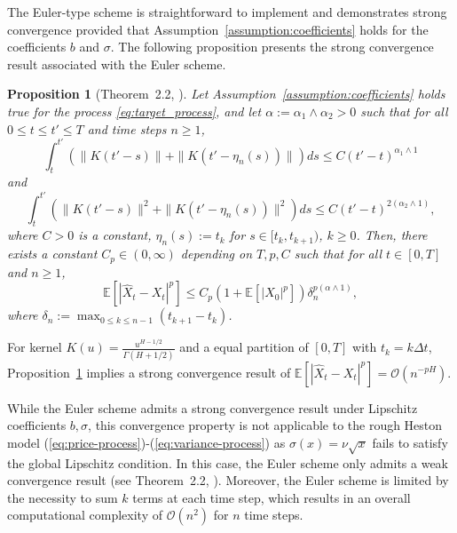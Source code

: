 \documentclass[11pt]{article}%
\newtheorem{proposition}{Proposition}
\theoremstyle{definition}
\begin{document}
The Euler-type scheme is straightforward to implement and demonstrates strong convergence provided that Assumption~\ref{assumption:coefficients} holds for the coefficients \(b\) and \(\sigma\). The following proposition presents the strong convergence result associated with the Euler scheme.

\begin{proposition}[Theorem~2.2, \cite{richard2021}]\label{prop:euler_convergence}
    Let Assumption~\ref{assumption:coefficients} holds true for the process \eqref{eq:target_process}, and let \(\alpha := \alpha_1 \wedge \alpha_2 > 0\) such that for all \(0\le t\le t'\le T\) and time steps \(n \ge 1\), \[
        \int_{t}^{t'} \left(\|K(t'-s)\| + \|K(t'-\eta_n(s))\|\right)ds \le C (t'-t)^{\alpha_1 \wedge 1}
    \]
    and \[
        \int_{t}^{t'} \left(\|K(t'-s)\|^2 + \|K(t'-\eta_n(s))\|^2\right)ds \le C (t'-t)^{2(\alpha_2 \wedge 1)},
    \]
    where \(C>0\) is a constant, \(\eta_n(s) := t_k\) for \(s \in [t_k,t_{k+1})\), \(k\ge 0\). Then, there exists a constant \(C_p \in (0,\infty)\) depending on \(T,p,C\) such that for all \(t\in [0,T]\) and \(n \ge 1\), 
    \[
    \mathbb{E}[|\widehat{X}_t - X_t|^p] \le C_p (1 + \mathbb{E}[|X_0|^p]) \delta_n^{p(\alpha \wedge 1)}, 
    \]
    where \(\delta_n := \max_{0\le k \le n-1} (t_{k+1} - t_k)\). 
\end{proposition}

For kernel \(K(u) = \tfrac{u^{H-1/2}}{\Gamma(H+1/2)}\) and a equal partition of \([0,T]\) with \(t_k = k\Delta t\), Proposition~\ref{prop:euler_convergence} implies a strong convergence result of \(\mathbb{E}[|\widehat{X}_t - X_t|^p] = \mathcal{O}(n^{-pH})\). 

While the Euler scheme admits a strong convergence result under Lipschitz coefficients \(b,\sigma\), this convergence property is not applicable to the rough Heston model (\ref{eq:price-process})-(\ref{eq:variance-process}) as \(\sigma(x) = \nu\sqrt{x}\) fails to satisfy the global Lipschitz condition. In this case, the Euler scheme only admits a weak convergence result (see Theorem~2.2, \cite{richard2023roughsimu}). Moreover, the Euler scheme is limited by the necessity to sum \(k\) terms at each time step, which results in an overall computational complexity of \(\mathcal{O}(n^2)\) for \(n\) time steps.
\end{document}
